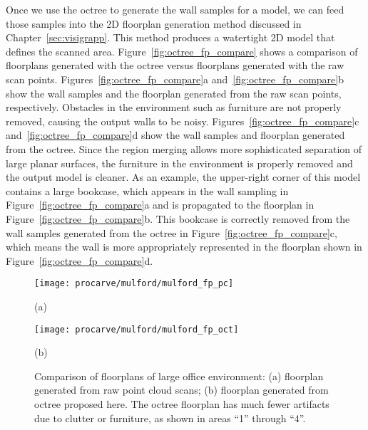 \documentclass[12pt,onecolumn,oneside]{book}
\begin{document}
Once we use the octree to generate the wall samples for a model, we can feed those samples into the 2D floorplan generation method discussed in Chapter~\ref{sec:visigrapp}.  This method produces a watertight 2D model that defines the scanned area.  Figure~\ref{fig:octree_fp_compare} shows a comparison of floorplans generated with the octree versus floorplans generated with the raw scan points.  Figures~\ref{fig:octree_fp_compare}a and~\ref{fig:octree_fp_compare}b show the wall samples and the floorplan generated from the raw scan points, respectively.  Obstacles in the environment such as furniture are not properly removed, causing the output walls to be noisy.  Figures~\ref{fig:octree_fp_compare}c and~\ref{fig:octree_fp_compare}d show the wall samples and floorplan generated from the octree.  Since the region merging allows more sophisticated separation of large planar surfaces, the furniture in the environment is properly removed and the output model is cleaner.  As an example, the upper-right corner of this model contains a large bookcase, which appears in the wall sampling in Figure~\ref{fig:octree_fp_compare}a and is propagated to the floorplan in Figure~\ref{fig:octree_fp_compare}b.  This bookcase is correctly removed from the wall samples generated from the octree in Figure~\ref{fig:octree_fp_compare}c, which means the wall is more appropriately represented in the floorplan shown in Figure~\ref{fig:octree_fp_compare}d.

\begin{figure}[t]

	\centering
	\begin{minipage}[t]{1.0\linewidth}
		\centerline{\texttt{[image: procarve/mulford/mulford\_fp\_pc]}}
		\centerline{(a)}
	\end{minipage}

	\begin{minipage}[t]{1.0\linewidth}
		\centerline{\texttt{[image: procarve/mulford/mulford\_fp\_oct]}}
		\centerline{(b)}
	\end{minipage}

	\caption[Comparison of floor plans of large office environment.]{Comparison of floorplans of large office environment: (a) floorplan generated from raw point cloud scans; (b) floorplan generated from octree proposed here.  The octree floorplan has much fewer artifacts due to clutter or furniture, as shown in areas ``1'' through ``4''.}
	\label{fig:compare_fp_mulford}

\end{figure}
\end{document}
